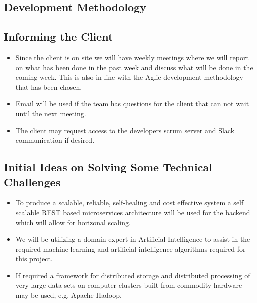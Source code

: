 \subsection{Development Methodology}


\subsection{Informing the Client}
\begin{itemize}
	\item Since the client is on site we will have weekly meetings where we will report on what has been done in the past week and discuss what will be done in the coming week. This is also in line with the Aglie development methodology that has been chosen.
	\item Email will be used if the team has questions for the client that can not wait until the next meeting.
	\item The client may request access to the developers scrum server and Slack communication if desired.
\end{itemize}

\subsection{Initial Ideas on Solving Some Technical Challenges}
\begin{itemize}
  \item To produce a scalable, reliable, self-healing and cost effective system a self scalable REST based microservices architecture will be used for the backend which will allow for horizonal scaling.
	\item We will be utilizing a domain expert in Artificial Intelligence to assist in the required machine learning and artificial intelligence algorithms required for this project.
  \item If required a framework for distributed storage and distributed processing of very large data sets on computer clusters built from commodity hardware may be used, e.g. Apache Hadoop.
\end{itemize}

